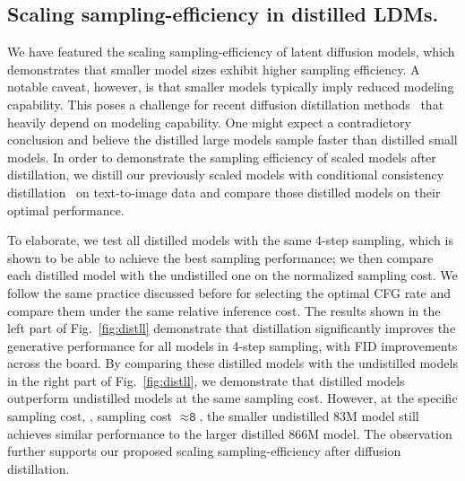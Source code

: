 \subsection{Scaling sampling-efficiency in distilled LDMs.}
\label{sec:scalingdistill}

We have featured the scaling sampling-efficiency of latent diffusion models, which demonstrates that smaller model sizes exhibit higher sampling efficiency.
A notable caveat, however, is that smaller models typically imply reduced modeling capability. This poses a challenge for recent diffusion distillation methods~\cite{luhman2021knowledge, salimans2022progressive, song2023consistency, sauer2023adversarial, gu2023boot, mei2023conditional,luo2023latent, lin2024sdxl} that heavily depend on modeling capability.
One might expect a contradictory conclusion and believe the distilled large models sample faster than distilled small models.
In order to demonstrate the sampling efficiency of scaled models after distillation, we distill our previously scaled models with conditional consistency distillation~\cite{song2023consistency, mei2023conditional} on text-to-image data and compare those distilled models on their optimal performance.

To elaborate, we test all distilled models with the same 4-step sampling, which is shown to be able to achieve the best sampling performance; we then compare each distilled model with the undistilled one on the normalized sampling cost.
We follow the same practice discussed before for selecting the optimal CFG rate and compare them under the same relative inference cost.
The results shown in the left part of Fig.~\ref{fig:distll} demonstrate that distillation significantly improves the generative performance for all models in 4-step sampling, with FID improvements across the board.
By comparing these distilled models with the undistilled models in the right part of Fig.~\ref{fig:distll}, we demonstrate that distilled models outperform undistilled models at the same sampling cost.
However, at the specific sampling cost, \ie, sampling cost $\approx \texttt{8}$, the smaller undistilled 83M model still achieves similar performance to the larger distilled 866M model.
%
The observation further supports our proposed scaling sampling-efficiency after diffusion distillation.


